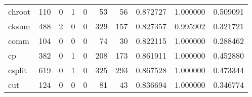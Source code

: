 \begin{tabular}{lrrrrrrrrr}
chroot    &                                   110 &                                                  0 &                                                  1 &                                                  0 &                                                 53 &                                                 56 &                                           0.872727 &                               1.000000 &                             0.509091 \\
cksum     &                                   488 &                                                  2 &                                                  0 &                                                  0 &                                                329 &                                                157 &                                           0.827357 &                               0.995902 &                             0.321721 \\
comm      &                                   104 &                                                  0 &                                                  0 &                                                  0 &                                                 74 &                                                 30 &                                           0.822115 &                               1.000000 &                             0.288462 \\
cp        &                                   382 &                                                  0 &                                                  1 &                                                  0 &                                                208 &                                                173 &                                           0.861911 &                               1.000000 &                             0.452880 \\
csplit    &                                   619 &                                                  0 &                                                  1 &                                                  0 &                                                325 &                                                293 &                                           0.867528 &                               1.000000 &                             0.473344 \\
cut       &                                   124 &                                                  0 &                                                  0 &                                                  0 &                                                 81 &                                                 43 &                                           0.836694 &                               1.000000 &                             0.346774 \\

\end{tabular}
